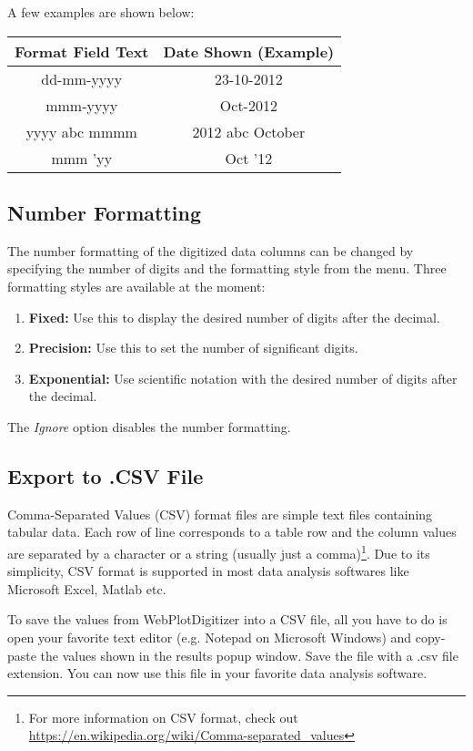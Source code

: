 \documentclass[letterpaper, 11pt]{article}
\begin{document}
A few examples are shown below:

\begin{center}
\begin{tabular}{|c|c|}
\hline
Format Field Text & Date Shown (Example)\\
\hline
dd-mm-yyyy & 23-10-2012\\
mmm-yyyy & Oct-2012\\
yyyy abc mmmm & 2012 abc October\\
mmm 'yy & Oct '12\\
\hline
\end{tabular}
\end{center}

\subsection{Number Formatting}
The number formatting of the digitized data columns can be changed by specifying the number of digits and the formatting style from the menu. Three formatting styles are available at the moment: 

\begin{enumerate}
\item{{\bf Fixed:} Use this to display the desired number of digits after the decimal.}
\item{{\bf Precision:} Use this to set the number of significant digits.}
\item{{\bf Exponential: } Use scientific notation with the desired number of digits after the decimal.}
\end{enumerate}

\noindent{}The \emph{Ignore} option disables the number formatting.

\subsection{Export to .CSV File}
Comma-Separated Values (CSV) format files are simple text files containing tabular data. Each row of line corresponds to a table row and the column values are separated by a character or a string (usually just a comma)\footnote{For more information on CSV format, check out \url{https://en.wikipedia.org/wiki/Comma-separated_values}}. Due to its simplicity, CSV format is supported in most data analysis softwares like Microsoft Excel, Matlab etc.

To save the values from WebPlotDigitizer into a CSV file, all you have to do is open your favorite text editor (e.g. Notepad on Microsoft Windows) and copy-paste the values shown in the results popup window. Save the file with a .csv file extension. You can now use this file in your favorite data analysis software.
\end{document}
